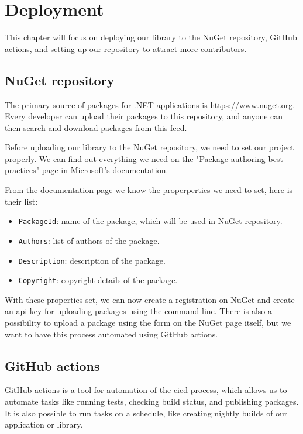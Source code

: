\chapter {Deployment}

This chapter will focus on deploying our library to the NuGet repository, GitHub actions, and setting up our repository to attract more contributors.

\section {NuGet repository}

The primary source of packages for .NET applications is \url{https://www.nuget.org}.
Every developer can upload their packages to this repository, and anyone can then search and download packages from this feed.

Before uploading our library to the NuGet repository, we need to set our project properly.
We can find out everything we need on the "Package authoring best practices" page in Microsoft's documentation. \cite{gill_package_2022}

From the documentation page \cite{gill_package_2022} we know the properperties we need to set, here is their list:

\begin{itemize}
    \item \texttt{PackageId}: name of the package, which will be used in NuGet repository.
    \item \texttt{Authors}: list of authors of the package.
    \item \texttt{Description}: description of the package.
    \item \texttt{Copyright}: copyright details of the package.
\end{itemize}

With these properties set, we can now create a registration on NuGet and create an \acrshort{api} key for uploading packages using the command line.
There is also a possibility to upload a package using the form on the NuGet page itself, but we want to have this process automated using GitHub actions.

\section{GitHub actions}

GitHub actions is a tool for automation of the \acrfull{cicd} process, which allows us to automate tasks like running tests, checking build status, and publishing packages.
It is also possible to run tasks on a schedule, like creating nightly builds of our application or library.

